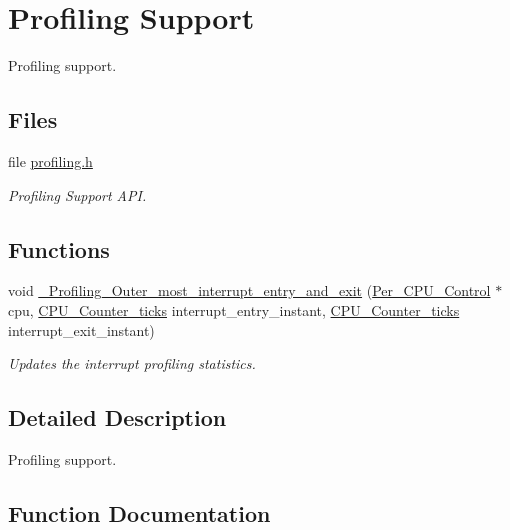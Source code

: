\hypertarget{group__RTEMSScoreProfiling}{}\section{Profiling Support}
\label{group__RTEMSScoreProfiling}


Profiling support.  


\subsection*{Files}
\begin{DoxyCompactItemize}
\item 
file \mbox{\hyperlink{score_2profiling_8h}{profiling.\+h}}
\begin{DoxyCompactList}\small\item\em Profiling Support A\+PI. \end{DoxyCompactList}\end{DoxyCompactItemize}
\subsection*{Functions}
\begin{DoxyCompactItemize}
\item 
void \mbox{\hyperlink{group__RTEMSScoreProfiling_gace38c105d6f0d670b87efe33ce6e01a3}{\+\_\+\+Profiling\+\_\+\+Outer\+\_\+most\+\_\+interrupt\+\_\+entry\+\_\+and\+\_\+exit}} (\mbox{\hyperlink{structPer__CPU__Control}{Per\+\_\+\+C\+P\+U\+\_\+\+Control}} $\ast$cpu, \mbox{\hyperlink{no__cpu_2include_2rtems_2score_2cpu_8h_a67f8550aad58bccb6fcb4589894444ad}{C\+P\+U\+\_\+\+Counter\+\_\+ticks}} interrupt\+\_\+entry\+\_\+instant, \mbox{\hyperlink{no__cpu_2include_2rtems_2score_2cpu_8h_a67f8550aad58bccb6fcb4589894444ad}{C\+P\+U\+\_\+\+Counter\+\_\+ticks}} interrupt\+\_\+exit\+\_\+instant)
\begin{DoxyCompactList}\small\item\em Updates the interrupt profiling statistics. \end{DoxyCompactList}\end{DoxyCompactItemize}


\subsection{Detailed Description}
Profiling support. 



\subsection{Function Documentation}
\mbox{\label{group__RTEMSScoreProfiling_gace38c105d6f0d670b87efe33ce6e01a3}} 

